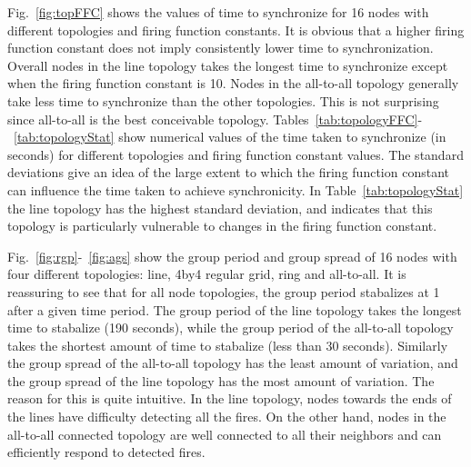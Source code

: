 Fig.~\ref{fig:topFFC} shows the values of time to synchronize for 16 nodes with different
topologies and firing function constants.  It is obvious that a higher firing function
constant does not imply consistently lower time to synchronization.  Overall nodes in the
line topology takes the longest time to synchronize except when the firing function constant
is 10. 
Nodes in the all-to-all topology generally take less time to synchronize than the other
topologies. This is not surprising since all-to-all is the best conceivable topology.
Tables~\ref{tab:topologyFFC}-~\ref{tab:topologyStat} show numerical values of the
time taken to synchronize (in seconds) for different topologies and firing function
constant values. The standard deviations give an idea of the large extent to
which the firing function constant can influence the time taken to achieve synchronicity.
In Table~\ref{tab:topologyStat} the line topology has the highest standard deviation,
and indicates that this topology is particularly vulnerable to changes in the firing function
constant.

Fig.~\ref{fig:rgp}-~\ref{fig:ags} show the group period and group spread of 16 nodes
with four different topologies: line, 4by4 regular grid, ring and all-to-all.
It is reassuring to see that for all node topologies, the group period stabalizes
at 1 after a given time period.  The group period of the line topology takes the
longest time to stabalize (190 seconds), while the group period of the all-to-all topology 
takes the shortest amount of time to stabalize (less than 30 seconds). Similarly
the group spread of the all-to-all topology has the least amount of variation,
and the group spread of the line topology has the most amount of variation.
The reason for this is quite intuitive. In the line topology, nodes towards the ends
of the lines have difficulty detecting all the fires. On the other hand, nodes in the
all-to-all connected topology are well connected to all their neighbors and
can efficiently respond to detected fires.



